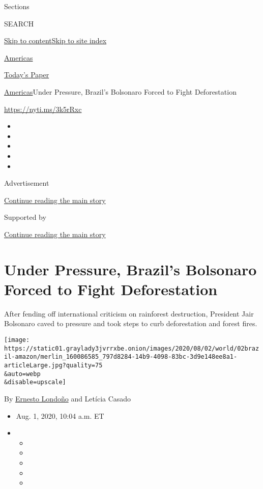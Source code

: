 Sections

SEARCH

\protect\hyperlink{site-content}{Skip to
content}\protect\hyperlink{site-index}{Skip to site index}

\href{https://www.nytimes3xbfgragh.onion/section/world/americas}{Americas}

\href{https://myaccount.nytimes3xbfgragh.onion/auth/login?response_type=cookie\&client_id=vi}{}

\href{https://www.nytimes3xbfgragh.onion/section/todayspaper}{Today's
Paper}

\href{/section/world/americas}{Americas}\textbar{}Under Pressure,
Brazil's Bolsonaro Forced to Fight Deforestation

\url{https://nyti.ms/3k5rRxc}

\begin{itemize}
\item
\item
\item
\item
\item
\end{itemize}

Advertisement

\protect\hyperlink{after-top}{Continue reading the main story}

Supported by

\protect\hyperlink{after-sponsor}{Continue reading the main story}

\hypertarget{under-pressure-brazils-bolsonaro-forced-to-fight-deforestation}{%
\section{Under Pressure, Brazil's Bolsonaro Forced to Fight
Deforestation}\label{under-pressure-brazils-bolsonaro-forced-to-fight-deforestation}}

After fending off international criticism on rainforest destruction,
President Jair Bolsonaro caved to pressure and took steps to curb
deforestation and forest fires.

\texttt{[image: https://static01.graylady3jvrrxbe.onion/images/2020/08/02/world/02brazil-amazon/merlin\_160086585\_797d8284-14b9-4098-83bc-3d9e148ee8a1-articleLarge.jpg?quality=75\\\&auto=webp\\\&disable=upscale]}

By \href{https://www.nytimes3xbfgragh.onion/by/ernesto-londono}{Ernesto
Londoño} and Letícia Casado

\begin{itemize}
\item
  Aug. 1, 2020, 10:04 a.m. ET
\item
  \begin{itemize}
  \item
  \item
  \item
  \item
  \item
  \end{itemize}
\end{itemize}

